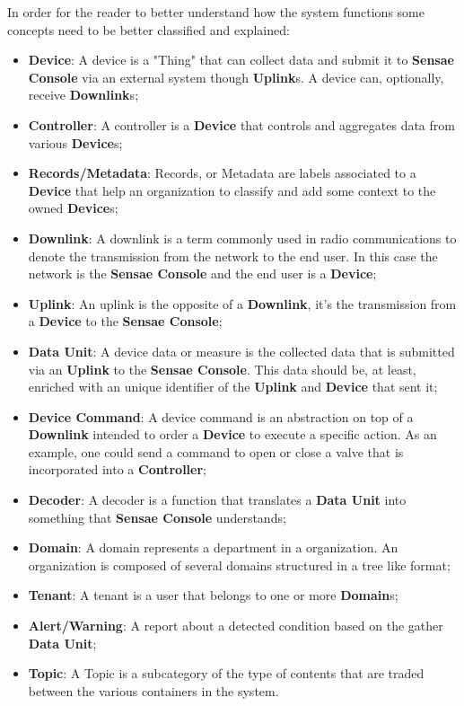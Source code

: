In order for the reader to better understand how the system functions some concepts need to be better classified and explained:

\begin{itemize}
   \item \textbf{Device}: A device is a "Thing" that can collect data and submit it to \textbf{Sensae Console} via an external system though \textbf{Uplink}s. A device can, optionally, receive \textbf{Downlink}s;
   \item \textbf{Controller}: A controller is a \textbf{Device} that controls and aggregates data from various \textbf{Device}s;
   \item \textbf{Records/Metadata}: Records, or Metadata are labels associated to a \textbf{Device} that help an organization to classify and add some context to the owned \textbf{Device}s;
   \item \textbf{Downlink}: A downlink is a term commonly used in radio communications to denote the transmission from the network to the end user. In this case the network is the \textbf{Sensae Console} and the end user is a \textbf{Device};
   \item \textbf{Uplink}: An uplink is the opposite of a \textbf{Downlink}, it's the transmission from a \textbf{Device} to the \textbf{Sensae Console};
   \item \textbf{Data Unit}: A device data or measure is the collected data that is submitted via an \textbf{Uplink} to the \textbf{Sensae Console}. This data should be, at least, enriched with an unique identifier of the \textbf{Uplink} and \textbf{Device} that sent it;
   \item \textbf{Device Command}: A device command is an abstraction on top of a \textbf{Downlink} intended to order a \textbf{Device} to execute a specific action. As an example, one could send a command to open or close a valve that is incorporated into a \textbf{Controller};
   \item \textbf{Decoder}: A decoder is a function that translates a \textbf{Data Unit} into something that \textbf{Sensae Console} understands;
   \item \textbf{Domain}: A domain represents a department in a organization. An organization is composed of several domains structured in a tree like format;
   \item \textbf{Tenant}: A tenant is a user that belongs to one or more \textbf{Domain}s;
   \item \textbf{Alert/Warning}: A report about a detected condition based on the gather \textbf{Data Unit};
   \item \textbf{Topic}: A Topic is a subcategory of the type of contents that are traded between the various containers in the system.
\end{itemize}

